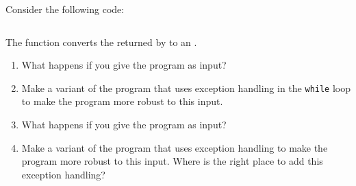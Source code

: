 Consider the following code:

\inputminted[fontsize=\small]{csharp}{\context/question/Accounts.cs}

The function  converts the  returned by  to an .

\begin{enumerate}
  \item What happens if you give the program  as input?
  \item Make a variant of the program that uses exception handling in the \texttt{while} loop to make the program more robust to this input.
  \item What happens if you give the program  as input?
  \item Make a variant of the program that uses exception handling to make the program more robust to this input. Where is the right place to add this exception handling?
\end{enumerate}

